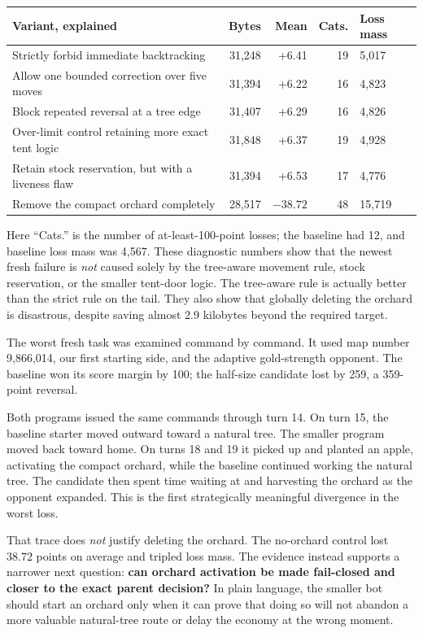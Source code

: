\documentclass[10pt,a4paper]{article}
\begin{document}
\begin{tabularx}{\textwidth}{@{}p{43mm}r r r Y@{}}
\toprule
\textbf{Variant, explained} & \textbf{Bytes} & \textbf{Mean} & \textbf{Cats.} & \textbf{Loss mass} \\
\midrule
Strictly forbid immediate backtracking & 31,248 & +6.41 & 19 & 5,017 \\
Allow one bounded correction over five moves & 31,394 & +6.22 & 16 & 4,823 \\
Block repeated reversal at a tree edge & 31,407 & +6.29 & 16 & 4,826 \\
Over-limit control retaining more exact tent logic & 31,848 & +6.37 & 19 & 4,928 \\
Retain stock reservation, but with a liveness flaw & 31,394 & +6.53 & 17 & 4,776 \\
Remove the compact orchard completely & 28,517 & $-38.72$ & 48 & 15,719 \\
\bottomrule
\end{tabularx}

Here ``Cats.'' is the number of at-least-100-point losses; the baseline had 12, and baseline
loss mass was 4,567. These diagnostic numbers show that the newest fresh failure is \emph{not}
caused solely by the tree-aware movement rule, stock reservation, or the smaller tent-door logic.
The tree-aware rule is actually better than the strict rule on the tail. They also show that
globally deleting the orchard is disastrous, despite saving almost 2.9 kilobytes beyond the
required target.

The worst fresh task was examined command by command. It used map number 9,866,014, our first
starting side, and the adaptive gold-strength opponent. The baseline won its score margin by
100; the half-size candidate lost by 259, a 359-point reversal.

Both programs issued the same commands through turn 14. On turn 15, the baseline starter moved
outward toward a natural tree. The smaller program moved back toward home. On turns 18 and 19 it
picked up and planted an apple, activating the compact orchard, while the baseline continued
working the natural tree. The candidate then spent time waiting at and harvesting the orchard
as the opponent expanded. This is the first strategically meaningful divergence in the worst
loss.

That trace does \emph{not} justify deleting the orchard. The no-orchard control lost 38.72 points
on average and tripled loss mass. The evidence instead supports a narrower next question:
\textbf{can orchard activation be made fail-closed and closer to the exact parent decision?}
In plain language, the smaller bot should start an orchard only when it can prove that doing so
will not abandon a more valuable natural-tree route or delay the economy at the wrong moment.
\end{document}
